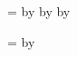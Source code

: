 \newcount\StudentPublications
{}

\newcount\CoauthorPublications
{}

\newcount\CollaborativePublications
{}

\newcount\AllPublications
\AllPublications=\FirstAuthorPublications
\advance\AllPublications by \StudentPublications
\advance\AllPublications by \CoauthorPublications
\advance\AllPublications by \CollaborativePublications

\newcount\AllCollaborativePublications
\AllCollaborativePublications=\CoauthorPublications
\advance\AllCollaborativePublications by \CollaborativePublications
